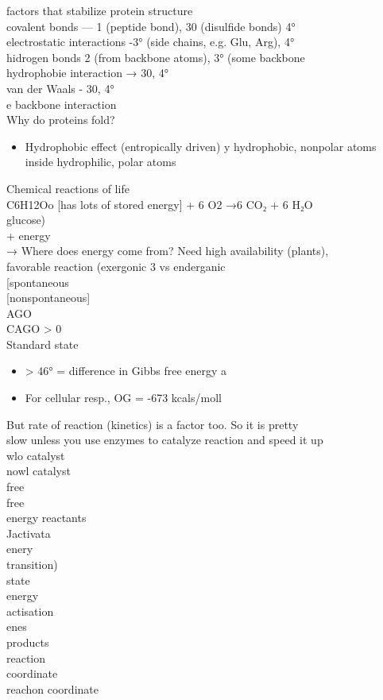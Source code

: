 \documentclass{article}
\begin{document}
factors that stabilize protein structure\\
covalent bonds — 1 (peptide bond), 30 (disulfide bonds) 4°\\
electrostatic interactions -3° (side chains, e.g. Glu, Arg), 4°\\
hidrogen bonds 2 (from backbone atoms), 3° (some backbone\\
hydrophobie interaction → 30, 4°\\
van der Waals - 30, 4°\\
e backbone interaction\\
Why do proteins fold?
\begin{itemize}
\item  Hydrophobic effect (entropically driven)
y hydrophobic, nonpolar atoms inside hydrophilic, polar atoms
\end{itemize}
Chemical reactions of life\\
C6H12Oo {[}has lots of stored energy{]} + 6 O2 →6 CO₂ + 6 H₂O\\
glucose)\\
+ energy\\
→ Where does energy come from? Need high availability (plants),\\
favorable reaction (exergonic 3 vs enderganic\\
{[}spontaneous\\
{[}nonspontaneous{]}\\
AGO\\
CAGO > 0\\
Standard state
\begin{itemize}
\item > 46° = difference in Gibbs free energy a
\item  For cellular resp., OG = -673 kcals/moll
\end{itemize}
But rate of reaction (kinetics) is a factor too. So it is pretty\\
slow unless you use enzymes to catalyze reaction and speed it up\\
wlo catalyst\\
nowl catalyst\\
free\\
free\\
energy reactants\\
Jactivata\\
enery\\
transition)\\
state\\
energy\\
actisation\\
enes\\
products\\
reaction\\
coordinate\\
reachon coordinate\\
\end{document}
